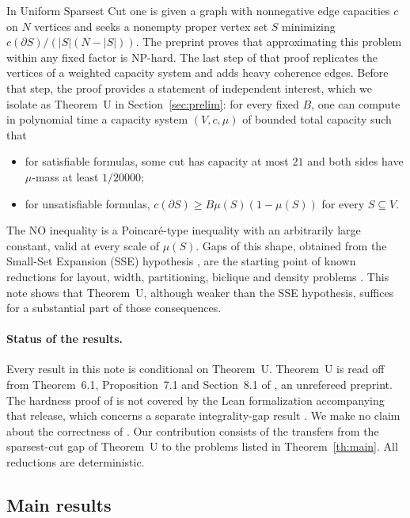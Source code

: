 \documentclass[11pt,letterpaper]{article}
\theoremstyle{definition}
\theoremstyle{remark}
\begin{document}
In Uniform Sparsest Cut one is given a graph with nonnegative edge
capacities \(c\) on \(N\) vertices and seeks a nonempty proper vertex set
\(S\) minimizing \(c(\partial S)/(|S|(N-|S|))\). The preprint
\cite{oai26} proves that approximating this problem within any fixed
factor is NP-hard. The last step of that proof replicates the vertices of a
weighted capacity system and adds heavy coherence edges. Before that step,
the proof provides a statement of independent interest, which we isolate as
Theorem~U in Section~\ref{sec:prelim}: for every fixed \(B\), one can compute
in polynomial time a capacity system \((V,c,\mu)\) of bounded total capacity
such that
\begin{itemize}[topsep=3pt,itemsep=2pt]
\item for satisfiable formulas, some cut has capacity at most \(21\) and
both sides have \(\mu\)-mass at least \(1/20000\);
\item for unsatisfiable formulas, \(c(\partial S)\ge B\mu(S)(1-\mu(S))\) for
every \(S\subseteq V\).
\end{itemize}
The NO inequality is a Poincar\'e-type inequality with an arbitrarily large
constant, valid at every scale of \(\mu(S)\). Gaps of this shape, obtained
from the Small-Set Expansion (SSE) hypothesis
\cite{rs10,rst12}, are the starting point of known reductions for layout,
width, partitioning, biclique and density problems
\cite{apw12,wapl14,yam18,bfk14,man18}. This note shows that Theorem~U,
although weaker than the SSE hypothesis, suffices for a substantial part of
those consequences.

\paragraph{Status of the results.}
Every result in this note is conditional on Theorem~U. Theorem~U is read off
from Theorem~6.1, Proposition~7.1 and Section~8.1 of \cite{oai26}, an
unrefereed preprint. The hardness proof of \cite{oai26} is not covered by
the Lean formalization accompanying that release, which concerns a separate
integrality-gap result \cite{oailean}. We make no claim about the correctness
of \cite{oai26}. Our contribution consists of the transfers from the
sparsest-cut gap of Theorem~U to the problems listed in
Theorem~\ref{th:main}. All reductions are deterministic.

\subsection{Main results}
\end{document}

